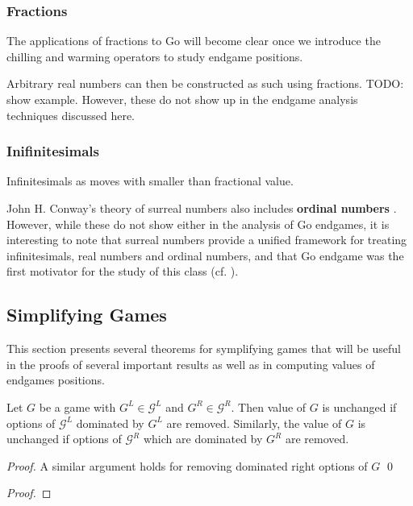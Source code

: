 \documentclass[../math194_paper.tex]{subfiles}
\begin{document}
\subsubsection{Fractions}

The applications of fractions to Go will become clear once we introduce 
the chilling and warming operators to study endgame positions. 

Arbitrary real numbers can then be constructed as such using fractions.
TODO: show example. 
However, these do not show up in the endgame analysis 
techniques discussed here.

\subsubsection{Inifinitesimals}

Infinitesimals as moves with smaller than fractional value. 

John H. Conway's theory of surreal numbers also includes \textbf{ordinal numbers} 
\cite{schleicher2006introduction}. However, while these do not show either in the analysis 
of Go endgames, it is interesting to note that surreal numbers provide a unified 
framework for treating infinitesimals, real numbers and ordinal numbers, and that 
Go endgame was the first motivator for the study of this class 
(cf. \cite[Prologue]{conway2000numbers}).

\subsection{Simplifying Games}

This section presents several theorems for symplifying games that will be 
useful in the proofs of several important results as well as in computing 
values of endgames positions. 

\begin{theorem}
    
\end{theorem}

\begin{theorem}
    Let $G$ be a game with $G^L \in \mathcal{G}^L$ and $G^R \in \mathcal{G}^R$.
    Then value of $G$ is unchanged if options of $\mathcal{G}^L$ dominated by $G^L$
    are removed. Similarly, the value of $G$ is unchanged if options of $\mathcal{G}^R$ 
    which are dominated by $G^R$ are removed. 
\end{theorem}

\begin{proof}
    A similar argument holds for removing dominated right options of $G$ \qed
\end{proof}

\begin{theorem}
\end{theorem}

\begin{proof}

\end{proof}
\end{document}
